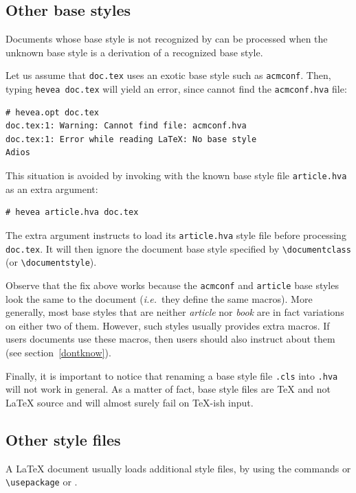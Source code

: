 \subsection{Other base styles}\label{otherbase}
Documents whose base style is not recognized by \hevea{} can be
processed when the unknown base style is a derivation of a
recognized base style.

Let us assume that \texttt{doc.tex} uses an exotic
base style such as \texttt{acmconf}. Then, typing
\verb+hevea doc.tex+ will yield an error, since
\hevea{} cannot find the \texttt{acmconf.hva} file:
\begin{verbatim}
# hevea.opt doc.tex
doc.tex:1: Warning: Cannot find file: acmconf.hva
doc.tex:1: Error while reading LaTeX: No base style
Adios
\end{verbatim}


This situation is avoided by invoking \hevea{} with the known
base style file  \texttt{article.hva} as an extra argument:
\begin{verbatim}
# hevea article.hva doc.tex
\end{verbatim}
The extra argument instructs
\hevea{} to load its \texttt{article.hva}
style file before processing \texttt{doc.tex}.
It will then ignore the document base style specified by
\verb+\documentclass+ (or \verb+\documentstyle+).

Observe that the fix above works because the \texttt{acmconf} and
\texttt{article} base styles look the same to the document
(\emph{i.e.}\ they define the same macros).
More generally, most  base styles that are neither
\textit{article} nor \textit{book} are in fact variations
on either two of them.
However, such styles usually provides extra macros.
If users documents use these macros, then users should also instruct
\hevea{} about them (see section~\ref{dontknow}).


Finally, it is important to notice that
renaming a base style file \verb+.cls+ into
\verb+.hva+ will not work in general.
As a matter of fact, base style files are \TeX{} and not \LaTeX{} source and
\hevea{} will almost surely fail on \TeX-ish input.


\subsection{Other style files}
A \LaTeX{} document usually loads additional style files, by using
the commands  \verb++ or \verb+\usepackage+ or \verb++.


